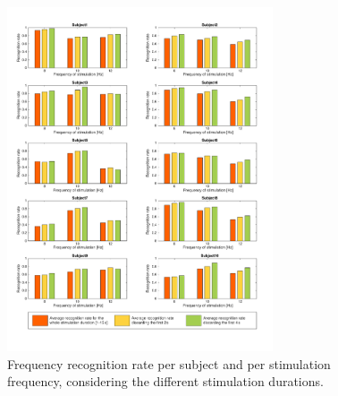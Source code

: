 \documentclass{svmult}
\begin{document}
\begin{figure}
\center
\includegraphics[width=0.7\textwidth]{figures/all-results-reconn.pdf}
\caption{Frequency recognition rate per subject and per stimulation frequency, considering the different stimulation durations.}
\label{fig:all-results-reconn}
\end{figure}
\end{document}
